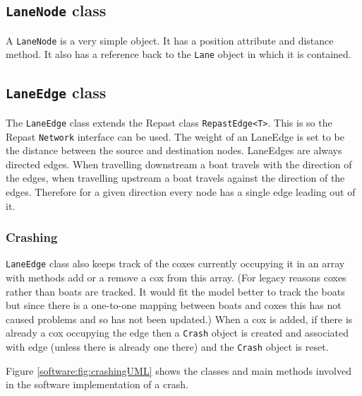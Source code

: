 

\subsection{\texttt{LaneNode} class}
A \texttt{LaneNode} is a very simple object. It has a position attribute and
distance method. It also has a reference back to the \texttt{Lane} object in
which it is contained.

\subsection{\texttt{LaneEdge} class}
The \texttt{LaneEdge} class extends the Repast class \texttt{RepastEdge<T>}. This is so
the Repast \texttt{Network} interface can be used. The weight of an LaneEdge is
set to be the distance between the source and destination
nodes. LaneEdges are always directed edges. When travelling downstream
a boat travels with the direction of the edges, when travelling
upstream a boat travels against the direction of the edges. Therefore
for a given direction every node has a single edge leading out of it.

\subsubsection{Crashing}

\texttt{LaneEdge} class also keeps track of the coxes currently occupying it
in an array with methods add or a remove a cox from this array. (For
legacy reasons coxes rather than boats are tracked. It would fit the
model better to track the boats but since there is a one-to-one
mapping between boats and coxes this has not caused problems and so
has not been updated.) When a
cox is added, if there is already a cox occupying the edge then a
\texttt{Crash} object is created and associated with edge (unless there is
already one there) and the \texttt{Crash} object is reset.

Figure \ref{software:fig:crashingUML} shows the classes and main methods involved in the software implementation of a crash.

